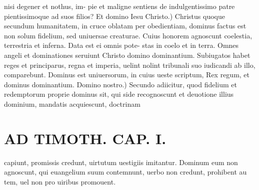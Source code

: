 \documentclass{article}
\begin{document}
\begin{pages}
nisi degener et nothus, im- pie et maligne sentiens de indulgentissimo patre pientissimoque ad suos filios? Et domino Iesu Christo.) Christus quoque secundum humanitatem, in cruce oblatam per obedientiam, dominus factus est non solum fidelium, sed uniuersae creaturae. Cuius honorem agnoscunt coelestia, terrestria et inferna. Data est ei omnis pote- stas in coelo et in terra. Omnes angeli et dominationes seruiunt Christo domino dominantium. Subiugatos habet reges et principarus, regna et imperia, uelint nolint tribunali suo iudicandi ab illo, comparebunt. Dominus est uniuersorum, in cuius ueste scriptum, Rex regum, et dominus dominantium. Domino nostro.) Secundo adiicitur, quod fidelium et redemptorum proprie dominus sit, qui side recognoscunt et deuotione illius dominium, mandatis acquiescunt, doctrinam  \pend
\section*{AD TIMOTH. CAP. I. }
\marginpar{[ p.467 ]}\pstart capiunt, promissis credunt, uirtutum uestigiis imitantur. Dominum eum non agnoscunt, qui euangelium suum contemnunt, uerbo non credunt, prohibent au tem, uel non pro uiribus promouent.  \pend
{}
{}

\end{pages}
\end{document}
